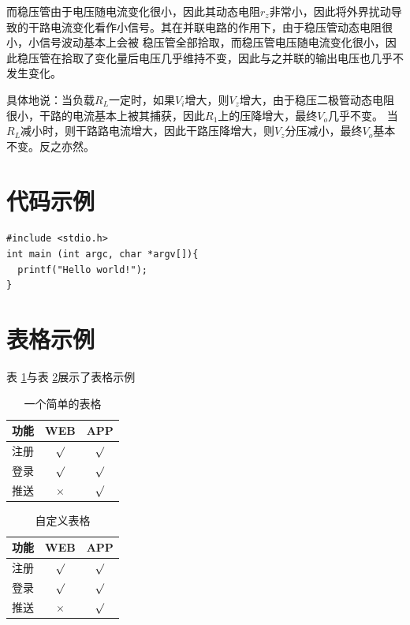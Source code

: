 \documentclass[a4paper,11pt,UTF8]{ctexart}
\begin{document}
而稳压管由于电压随电流变化很小，因此其动态电阻$r_z$非常小，因此将外界扰动导致的干路电流变化看作小信号。其在并联电路的作用下，由于稳压管动态电阻很小，小信号波动基本上会被
稳压管全部拾取，而稳压管电压随电流变化很小，因此稳压管在拾取了变化量后电压几乎维持不变，因此与之并联的输出电压也几乎不发生变化。

具体地说：当负载$R_L$一定时，如果$V_i$增大，则$V_z$增大，由于稳压二极管动态电阻很小，干路的电流基本上被其捕获，因此$R_1$上的压降增大，最终$V_o$几乎不变。
当$R_L$减小时，则干路路电流增大，因此干路压降增大，则$V_z$分压减小，最终$V_o$基本不变。反之亦然。

\newpage
\begin{appendix}

\section{代码示例}

\begin{lstlisting}[caption={一段C代码},captionpos=b]
#include <stdio.h>
int main (int argc, char *argv[]){
  printf("Hello world!");
}
\end{lstlisting}

\section{表格示例}
表 \ref{tab:tab1}与表 \ref{tab:tab2}展示了表格示例
\begin{table}[!h!tbp]
\caption{一个简单的表格}\label{tab:tab1}
  \centering
  \begin{tabular}{|l|c|c|}
	\hline
	功能          &WEB         &APP         \\ \hline
	注册          &$\surd$     &$\surd$     \\ \hline
	登录          &$\surd$     &$\surd$     \\ \hline
	推送          &$\times$    &$\surd$     \\ \hline
\end{tabular}
\end{table}

\begin{table}[!h!tbp]
\caption{自定义表格}\label{tab:tab2}
  \centering
\begin{tabular*}{0.75\textwidth}{@{\extracolsep{\fill}}lcc}
    \toprule
    功能          &WEB         &APP         \\
    \midrule
    注册          &$\surd$     &$\surd$     \\
    登录          &$\surd$     &$\surd$     \\
    推送          &$\times$    &$\surd$     \\
    \bottomrule
\end{tabular*}
\end{table}



\end{appendix}
\end{document}
